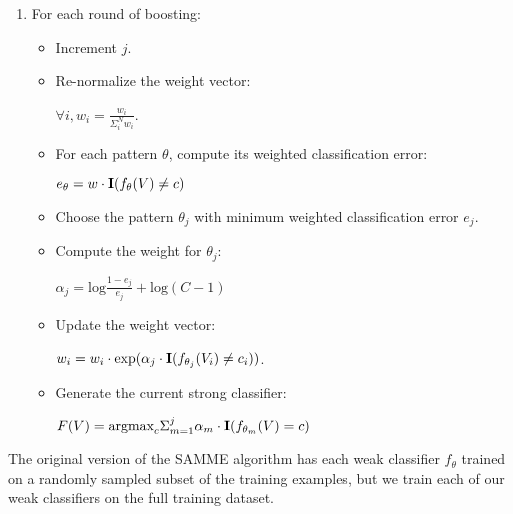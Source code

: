 \documentclass{bmvc2k}
\begin{document}
\begin{enumerate}
				\item For each round of boosting:
					\begin{itemize}
						\item Increment $j$.
						\item Re-normalize the weight vector:
              \begin{center}
              $\forall i, w_i = \frac{w_i}{\Sigma_i^N w_i}$.
              \end{center}
					  \item For each pattern $\theta$,
              compute its weighted classification error:
              \begin{center}
              $e_\theta = w \cdot \mbox{\textbf{I}}(f_\theta(V) \neq c)$
              \end{center}
						\item Choose the pattern $\theta_j$ with minimum weighted
              classification error $e_j$.
						\item Compute the weight for $\theta_j$:
              \begin{center}
              $\alpha_j = \mbox{log} \frac{1 - e_j}{e_j} + \mbox{log}(C-1)$
              \end{center}
						\item Update the weight vector:
              \begin{center}
							$w_i = w_i \cdot \mbox{exp}(\alpha_j \cdot
							\mbox{\textbf{I}}(f_{\theta_j}(V_i) \neq c_i))$.
              \end{center}
						\item Generate the current strong classifier:
              \begin{center}
							$F(V) = \mbox{argmax}_c \Sigma_{m=1}^j \alpha_m \cdot
							\mbox{\textbf{I}}(f_{\theta_m}(V) = c)$
              \end{center}
					\end{itemize}

			\end{enumerate}
	
	The original version of the SAMME algorithm has each weak classifier
	$f_\theta$ trained on
	a randomly sampled subset of the training examples, but we train each of
	our weak classifiers on the full training dataset.
\end{document}
